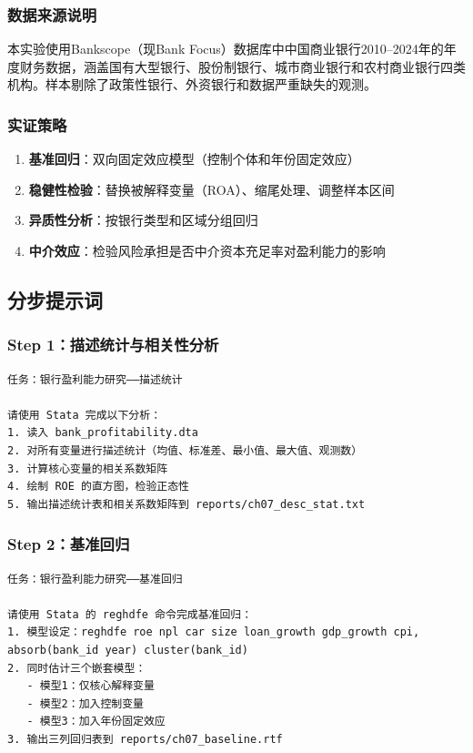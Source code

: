 \subsubsection{数据来源说明}

本实验使用Bankscope（现Bank Focus）数据库中中国商业银行2010--2024年的年度财务数据，涵盖国有大型银行、股份制银行、城市商业银行和农村商业银行四类机构。样本剔除了政策性银行、外资银行和数据严重缺失的观测。

\subsubsection{实证策略}

\begin{enumerate}[leftmargin=2em]
  \item \textbf{基准回归}：双向固定效应模型（控制个体和年份固定效应）
  \item \textbf{稳健性检验}：替换被解释变量（ROA）、缩尾处理、调整样本区间
  \item \textbf{异质性分析}：按银行类型和区域分组回归
  \item \textbf{中介效应}：检验风险承担是否中介资本充足率对盈利能力的影响
\end{enumerate}

\subsection{分步提示词}

\subsubsection{Step 1：描述统计与相关性分析}

\begin{lstlisting}
任务：银行盈利能力研究——描述统计

请使用 Stata 完成以下分析：
1. 读入 bank_profitability.dta
2. 对所有变量进行描述统计（均值、标准差、最小值、最大值、观测数）
3. 计算核心变量的相关系数矩阵
4. 绘制 ROE 的直方图，检验正态性
5. 输出描述统计表和相关系数矩阵到 reports/ch07_desc_stat.txt
\end{lstlisting}

\subsubsection{Step 2：基准回归}

\begin{lstlisting}
任务：银行盈利能力研究——基准回归

请使用 Stata 的 reghdfe 命令完成基准回归：
1. 模型设定：reghdfe roe npl car size loan_growth gdp_growth cpi, absorb(bank_id year) cluster(bank_id)
2. 同时估计三个嵌套模型：
   - 模型1：仅核心解释变量
   - 模型2：加入控制变量
   - 模型3：加入年份固定效应
3. 输出三列回归表到 reports/ch07_baseline.rtf
\end{lstlisting}

